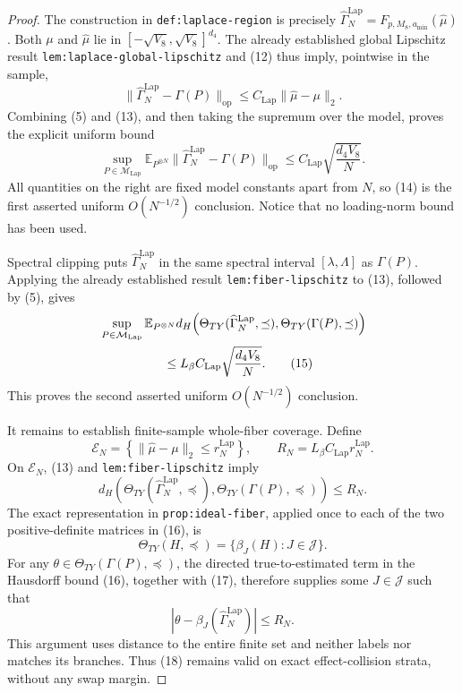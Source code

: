 \documentclass{article}
\begin{document}
\begin{proof}
The construction in \texttt{def:laplace-region} is precisely
\(\widehat\Gamma_N^{\mathrm{Lap}}
=F_{p,M_8,a_{\min}}(\widehat\mu)\).  Both \(\mu\) and
\(\widehat\mu\) lie in
\([-\sqrt{V_8},\sqrt{V_8}]^{d_4}\).  The already established global
Lipschitz result \texttt{lem:laplace-global-lipschitz} and (12) thus imply,
pointwise in the sample,
\[
 \lVert\widehat\Gamma_N^{\mathrm{Lap}}-\Gamma(P)\rVert_{\mathrm{op}}
 \leq C_{\mathrm{Lap}}\lVert\widehat\mu-\mu\rVert_2.   \tag{13}
\]
Combining (5) and (13), and then taking the supremum over the model, proves
the explicit uniform bound
\[
 \sup_{P\in\mathcal M_{\mathrm{Lap}}}
 \mathbb E_{P^{\otimes N}}
 \lVert\widehat\Gamma_N^{\mathrm{Lap}}-\Gamma(P)\rVert_{\mathrm{op}}
 \leq C_{\mathrm{Lap}}\sqrt{\frac{d_4V_8}{N}}.          \tag{14}
\]
All quantities on the right are fixed model constants apart from \(N\), so
(14) is the first asserted uniform \(O(N^{-1/2})\) conclusion.  Notice that
no loading-norm bound has been used.

Spectral clipping puts \(\widehat\Gamma_N^{\mathrm{Lap}}\) in the same
spectral interval \([\lambda,\Lambda]\) as \(\Gamma(P)\).  Applying the
already established result \texttt{lem:fiber-lipschitz} to (13), followed by
(5), gives
\[
 \begin{aligned}
 &\sup_{P\in\mathcal M_{\mathrm{Lap}}}
 \mathbb E_{P^{\otimes N}}
 d_H\!\left(
 \Theta_{TY}(\widehat\Gamma_N^{\mathrm{Lap}},\preceq),
 \Theta_{TY}(\Gamma(P),\preceq)
 \right)\\
 &\hspace{18mm}\leq
 L_\beta C_{\mathrm{Lap}}\sqrt{\frac{d_4V_8}{N}}.
                                                               \tag{15}
 \end{aligned}
\]
This proves the second asserted uniform \(O(N^{-1/2})\) conclusion.

It remains to establish finite-sample whole-fiber coverage.  Define
\[
 \mathcal E_N=
 \left\{\lVert\widehat\mu-\mu\rVert_2
 \leq r_N^{\mathrm{Lap}}\right\},
 \qquad
 R_N=L_\beta C_{\mathrm{Lap}}r_N^{\mathrm{Lap}}.
\]
On \(\mathcal E_N\), (13) and \texttt{lem:fiber-lipschitz} imply
\[
 d_H\!\left(
 \Theta_{TY}(\widehat\Gamma_N^{\mathrm{Lap}},\preceq),
 \Theta_{TY}(\Gamma(P),\preceq)
 \right)\leq R_N.                                      \tag{16}
\]
The exact representation in \texttt{prop:ideal-fiber}, applied once to each
of the two positive-definite matrices in (16), is
\[
 \Theta_{TY}(H,\preceq)=\{\beta_J(H):J\in\mathcal J\}. \tag{17}
\]
For any \(\theta\in\Theta_{TY}(\Gamma(P),\preceq)\), the directed
true-to-estimated term in the Hausdorff bound (16), together with (17),
therefore supplies some \(J\in\mathcal J\) such that
\[
 \left\lvert
 \theta-\beta_J(\widehat\Gamma_N^{\mathrm{Lap}})
 \right\rvert\leq R_N.                                 \tag{18}
\]
This argument uses distance to the entire finite set and neither labels nor
matches its branches.  Thus (18) remains valid on exact effect-collision
strata, without any swap margin.


\end{proof}
\end{document}
